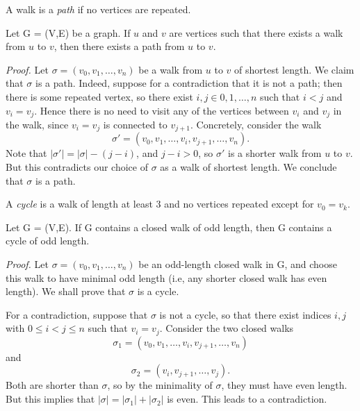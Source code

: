 \documentclass{tufte-handout}
\begin{document}
A walk is a \textit{path} if no vertices are repeated. 
\begin{Theorem}
    Let G = (V,E) be a graph. If \( u \) and \( v \) are 
    vertices such that there exists a walk from \( u \) to \( v \), then there exists a path from \( u \) to \( v \).
\end{Theorem}


\textit{Proof.} Let \( \sigma = (v_0, v_1, \ldots, v_n) \) be a walk from \( u \) to \( v \) of shortest length.
We claim that \( \sigma \) is a path. Indeed, suppose for a contradiction that it is not a path; then there is some repeated vertex,
so there exist \( i,j \in {0,1,\ldots,n}\) such that \(i < j \) and \( v_i = v_j \).  Hence
there is no need to visit any of the vertices between \( v_i \) and \( v_j \) in the walk,
since \( v_i = v_j\) is connected to \( v_{j+1} \). Concretely, consider the walk 
\[\sigma'=(v_0, v_1, \ldots, v_i, v_{j+1}, \ldots, v_n).\]
Note that \( \left|\sigma'\right| = \left|\sigma\right| - (j-i) \), and \( j-i>0 \), so \( \sigma' \) is a
shorter walk from \( u \) to \( v \). But this contradicts our choice of \( \sigma \) as a walk of shortest length.
We conclude that \( \sigma \) is a path.
\qedsymbol

A \textit{cycle} is a walk of length at least 3 and no vertices repeated except for \( v_0 = v_k \).

\begin{Proposition}
    \label{prop:odd_cycle}
    Let G = (V,E). If G contains a closed walk of odd length, then G contains a cycle of odd length.
\end{Proposition}


\textit{Proof.} Let \( \sigma = (v_0, v_1, \ldots, v_n) \) be an odd-length closed walk
in G, and choose this walk to have minimal odd length (i.e, any shorter closed walk has even length).
We shall prove that \( \sigma \) is a cycle.

For a contradiction, suppose that \( \sigma \) is not a cycle, so that there exist indices \( i,j \) with \( 0 \leq i < j \leq n \)
such that \( v_i = v_j \). Consider the two closed walks
\[\sigma_1 = (v_0, v_1, \ldots, v_i, v_{j+1},\ldots , v_{n})\] and
\[\sigma_2 = (v_i, v_{j+1}, \ldots, v_j).\]
Both are shorter than \( \sigma \), so by the minimality of \( \sigma \), they must have even length.
But this implies that \( \left|\sigma\right| = \left|\sigma_1\right| + \left|\sigma_2\right| \) is even.
This leads to a contradiction.
\end{document}
